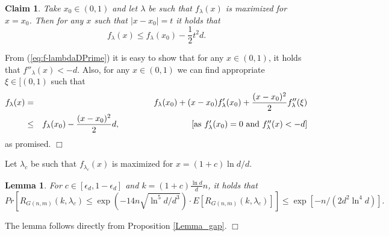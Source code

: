 \documentclass[a4paper,10pt]{article}
\makeatletter
\newtheorem{claim}{Claim}\renewcommand{\theclaim}{\arabic{claim}}
\newtheorem{lemma}{Lemma}\renewcommand{\thelemma}{\arabic{lemma}}
\newenvironment{proof}{\noindent{\bf Proof\@:}}{\hfill $\Box$\\}
\makeatother
\begin{document}
\begin{claim}\label{claim:UnlikeIS}
Take $x_0\in (0,1)$ and let $\lambda$ be such that $f_{\lambda}(x)$
is maximized for $x=x_0$. Then for any $x$ such that $|x-x_0|=t$
it holds that
\begin{displaymath}
f_{\lambda}(x)\leq f_{\lambda}(x_0)-\frac{1}{2}t^2d.
\end{displaymath}
\end{claim}
\begin{proof}
From (\ref{eq:f-lambdaDPrime}) it is easy to show that for any $x\in (0,1)$,
it holds that $f''_{\lambda}(x)<-d$. Also, for any $x\in (0,1)$ we can find 
appropriate $\xi\in [(0,1)$  such that 
\begin{eqnarray}
f_{\lambda}(x)&=&f_{\lambda}(x_0)+(x-x_0)f'_{\lambda}(x_0)+\frac{(x-x_0)^2}{2}f''_{\lambda}(\xi)
\nonumber \\
&\leq& f_{\lambda}(x_0)-\frac{(x-x_0)^2}{2}d, \hspace*{3cm}\mbox{[as $f'_{\lambda}(x_0)=0$ and $f''_{\lambda}(x)<-d$]}
\nonumber
\end{eqnarray}
as promised.
\end{proof}

\noindent
Let $\lambda_c$ be such that $f_{\lambda_c}(x)$ is maximized for 
$x=(1+c)\ln d/d$. 


\begin{lemma}\label{lemma:MassOfMaximum}
For $c\in [\epsilon_d,1-\epsilon_d]$ and $k=(1+c)\frac{\ln d}{d}n$, it holds that
\begin{displaymath}
Pr\left[R_{G(n,m)}(k,\lambda_{c})\leq \exp\left(-14n\sqrt{{\ln^5d}/{d^{3}}}\right)
\cdot E[R_{G(n,m)}(k,\lambda_{c})]  \right] \leq \exp\left[-n/(2d^2\ln^4d) \right].
\end{displaymath}
\end{lemma}
\begin{proof}
The lemma follows directly from Proposition  \ref{Lemma_gap}.
\end{proof}
\end{document}
